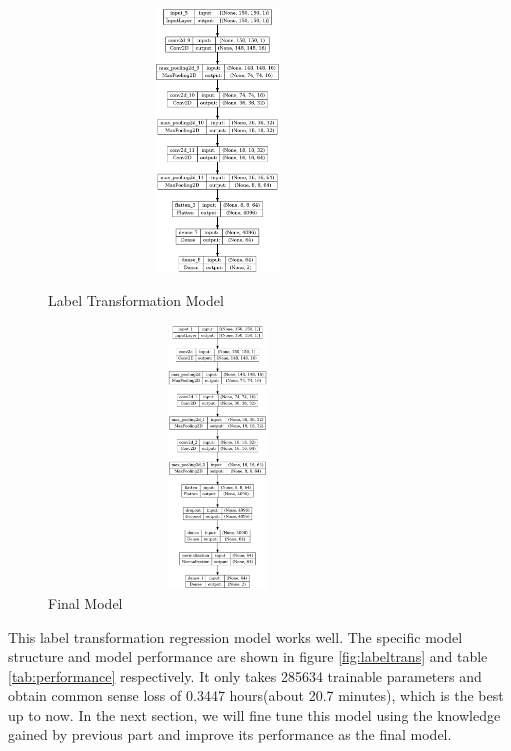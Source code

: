 \documentclass{article}
\begin{document}
\begin{figure}[!h]
	\centering
	\begin{minipage}[t]{0.4\textwidth}%
		\centering
		\includegraphics[width=0.8\textwidth, height=7cm]{./fig/label_model.png}
		\caption{Label Transformation Model}
		\label{fig:labeltrans}
	\end{minipage}
    \hspace{0.8cm}
	\begin{minipage}[t]{0.4\textwidth}%
		\centering
		\includegraphics[width=0.8\textwidth, height=7cm]{./fig/final_model.png}
		\caption{Final Model}
		\label{fig:final}
	\end{minipage}
\end{figure}

This label transformation regression model works well. The specific model structure and model performance are shown in figure \ref{fig:labeltrans} and table \ref{tab:performance} respectively. It only takes 285634 trainable parameters and obtain common sense loss of 0.3447 hours(about 20.7 minutes), which is the best up to now. In the next section, we will fine tune this model using the knowledge gained by previous part and improve its performance as the final model.
\end{document}
